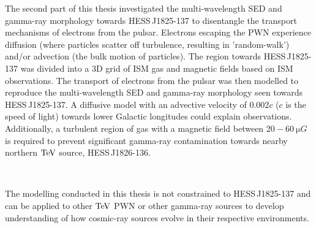 The second part of this thesis investigated the multi-wavelength SED and gamma-ray morphology towards \mbox{HESS\,J1825-137} to disentangle the transport mechanisms of electrons from the pulsar. Electrons escaping the PWN experience diffusion (where particles scatter off turbulence, resulting in 'random-walk') and/or advection (the bulk motion of particles). The region towards \mbox{HESS\,J1825-137} was divided into a 3D grid of ISM gas and magnetic fields based on ISM observations. The transport of electrons from the pulsar was then modelled to reproduce the multi-wavelength SED and gamma-ray morphology seen towards \mbox{HESS\,J1825-137}. A diffusive model with an advective velocity of $0.002c$ ($c$ is the speed of light) towards lower Galactic longitudes could explain observations. Additionally, a turbulent region of gas with a magnetic field between $20-60~\si{\micro G}$ is required to prevent significant gamma-ray contamination towards nearby northern $\TeV$ source, \mbox{HESS\,J1826-136}.
\par~\par
The modelling conducted in this thesis is not constrained to \mbox{HESS\,J1825-137} and can be applied to other $\TeV$ PWN or other gamma-ray sources to develop understanding of how cosmic-ray sources evolve in their respective environments.